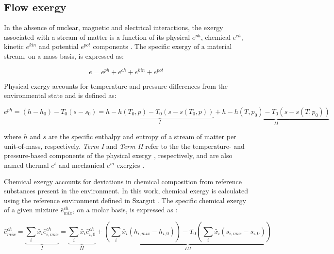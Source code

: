 \subsection{Flow exergy}

In the absence of nuclear, magnetic and electrical interactions, the exergy associated with a stream of matter is a function of its physical $e^{ph}$, chemical $e^{ch}$, kinetic $e^{kin}$ and potential $e^{pot}$ components \cite{BejanAdrian;TsatsaronisGeorge;Moran1996}. The specific exergy of a material stream, on a mass basis, is expressed as:

		
	\begin{equation}
		e=e^{ph}+e^{ch}+e^{kin}+e^{pot}
	\end{equation}

Physical exergy accounts for temperature and pressure differences from the environmental state and is defined as:  
		
	\begin{equation}
		e^{ph}=(h-h_0)-T_0(s-s_0)=\underbrace{h-h(T_0,p)-T_0\left(s-s(T_0,p)\right)}_{I}+\underbrace{h-h(T,p_0)-T_0\left(s-s(T,p_0)\right)}_{II}
	\end{equation}
	
	where $h$ and $s$ are the specific enthalpy and entropy of a stream of matter per unit-of-mass, respectively. \emph{Term I} and \emph{Term II} refer to the the temperature- and pressure-based components of the physical exergy \cite{Kotas1995}, respectively, and are also named thermal $e^{t}$ and mechanical $e^{m}$ exergies \cite{Tsatsaronis1993}.


Chemical exergy accounts for deviations in chemical composition from reference substances present in the environment. In this work, chemical exergy is calculated using the reference environment defined in Szargut \cite{Szargut1988,Szargut1989,Morris1986}. The specific chemical exergy of a given mixture $\bar{e}^{ch}_{mix}$, on a molar basis, is expressed as \cite{Sato2004}:

\begin{equation*}
	\bar{e}^{ch}_{mix}=\underbrace{\sum_i \bar{x}_i \bar{e}^{ch}_{i,mix}}_{I}=\underbrace{\sum_i \bar{x}_i \bar{e}^{ch}_{i,0}}_{II}+\underbrace{\left(\sum_i \bar{x}_i \left(h_{i,mix}-h_{i,0}\right)\right)-T_0\left(\sum_i \bar{x}_i \left(s_{i,mix}-s_{i,0}\right)\right)}_{III}
\end{equation*}

